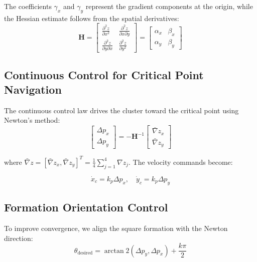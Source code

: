 \documentclass{article}
\begin{document}
The coefficients $\gamma_x$ and $\gamma_y$ represent the gradient components at the origin, while the Hessian estimate follows from the spatial derivatives:
\begin{equation}
\mathbf{H} = \begin{bmatrix} \frac{\partial^2 z}{\partial x^2} & \frac{\partial^2 z}{\partial x \partial y} \\ \frac{\partial^2 z}{\partial y \partial x} & \frac{\partial^2 z}{\partial y^2} \end{bmatrix} = \begin{bmatrix} \alpha_x & \beta_x \\ \alpha_y & \beta_y \end{bmatrix}
\end{equation}

\subsection{Continuous Control for Critical Point Navigation}

The continuous control law drives the cluster toward the critical point using Newton's method:
\begin{equation}
\begin{bmatrix} \Delta p_x \\ \Delta p_y \end{bmatrix} = -\mathbf{H}^{-1} \begin{bmatrix} \bar{\nabla}z_x \\ \bar{\nabla}z_y \end{bmatrix}
\end{equation}

where $\bar{\nabla}z = [\bar{\nabla}z_x, \bar{\nabla}z_y]^T = \frac{1}{4}\sum_{j=1}^{4} \nabla z_j$. The velocity commands become:

\begin{equation}
\dot{x}_c = k_p \Delta p_x, \quad \dot{y}_c = k_p \Delta p_y
\end{equation}

\subsection{Formation Orientation Control}

To improve convergence, we align the square formation with the Newton direction:
\begin{equation}
\theta_{\text{desired}} = \arctan2(\Delta p_y, \Delta p_x) + \frac{k\pi}{2}
\end{equation}
\end{document}
